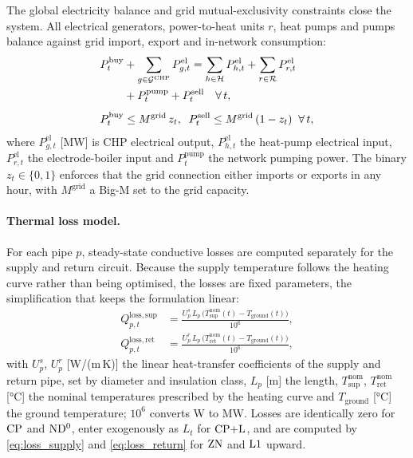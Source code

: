 The global electricity balance and grid mutual-exclusivity constraints close the system.
All electrical generators, power-to-heat units $r$, heat pumps and pumps balance against
grid import, export and in-network consumption:
%
\begin{align}
  P_t^{\mathrm{buy}}
    &+ \sum_{g \in \mathcal{G}^{\mathrm{CHP}}} P_{g,t}^{\mathrm{el}}
  = \sum_{h \in \mathcal{H}} P_{h,t}^{\mathrm{el}}
    + \sum_{r \in \mathcal{R}} P_{r,t}^{\mathrm{el}} \notag \\
    &+ P_t^{\mathrm{pump}} + P_t^{\mathrm{sell}}
  \quad \forall\, t,
  \label{eq:balance_el} \\[4pt]
  P_t^{\mathrm{buy}} &\leq M^{\mathrm{grid}}\, z_t,
  \;\;
  P_t^{\mathrm{sell}} \leq M^{\mathrm{grid}}\, (1 - z_t)
  \;\; \forall\, t,
  \label{eq:grid_bigm}
\end{align}
%
where $P_{g,t}^{\mathrm{el}}$ [MW] is CHP electrical output, $P_{h,t}^{\mathrm{el}}$ the
heat-pump electrical input, $P_{r,t}^{\mathrm{el}}$ the electrode-boiler input and
$P_t^{\mathrm{pump}}$ the network pumping power. The binary $z_t \in \{0,1\}$ enforces
that the grid connection either imports or exports in any hour, with $M^{\mathrm{grid}}$
a Big-M set to the grid capacity.

\paragraph{Thermal loss model.}
For each pipe $p$, steady-state conductive losses are computed separately for the supply
and return circuit. Because the supply temperature follows the heating curve rather than
being optimised, the losses are fixed parameters, the simplification that keeps the
formulation linear:
%
\begin{align}
  Q_{p,t}^{\mathrm{loss,sup}} &= \frac{U^{s}_p\, L_p\,
    \bigl(T_{\mathrm{sup}}^{\mathrm{nom}}(t)
    - T_{\mathrm{ground}}(t)\bigr)}{10^6},
  \label{eq:loss_supply} \\[4pt]
  Q_{p,t}^{\mathrm{loss,ret}} &= \frac{U^{r}_p\, L_p\,
    \bigl(T_{\mathrm{ret}}^{\mathrm{nom}}(t)
    - T_{\mathrm{ground}}(t)\bigr)}{10^6},
  \label{eq:loss_return}
\end{align}
%
with $U^{s}_p$, $U^{r}_p$ [W/(m\,K)] the linear heat-transfer coefficients of the supply
and return pipe, set by diameter and insulation class, $L_p$ [m] the length,
$T_{\mathrm{sup}}^{\mathrm{nom}}$, $T_{\mathrm{ret}}^{\mathrm{nom}}$ [°C] the nominal
temperatures prescribed by the heating curve and $T_{\mathrm{ground}}$ [°C] the ground
temperature; $10^6$ converts W to MW. Losses are identically zero for $\mathrm{CP}$ and $\mathrm{ND^{0}}$,
enter exogenously as $L_t$ for $\mathrm{CP{+}L}$, and are computed by \eqref{eq:loss_supply} and
\eqref{eq:loss_return} for $\mathrm{ZN}$ and $\mathrm{L1}$ upward.

